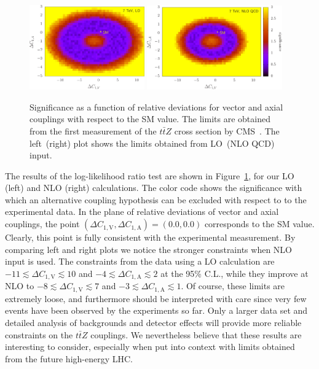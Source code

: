 \documentclass{JHEP3}
\def\ttbZ{t\bar{t}Z}
\def\DConeA{\Delta C_{1,\mathrm{A}}}
\def\DConeV{\Delta C_{1,\mathrm{V}}}
\begin{document}
\begin{figure}[t]
\centering 
\includegraphics[width=0.44\textwidth]{./CMS_LO.pdf}
\hspace{2mm}
\includegraphics[width=0.518\textwidth]{./CMS_NLO.pdf}
\caption{\label{fig:CMSbounds}
Significance as a function of relative deviations for vector and axial couplings with respect to the SM value. 
The limits are obtained from the first measurement of the $\ttbZ$ cross section by CMS~\cite{Chatrchyan:2013qca}. 
The left~(right) plot shows the limits obtained from LO~(NLO QCD) input.
}
\end{figure}
% 
The results of the log-likelihood ratio test are shown in Figure~\ref{fig:CMSbounds}, for our LO (left) and NLO (right) calculations.
The color code shows the significance with which an alternative coupling hypothesis can be excluded with respect to to the experimental data.
In the plane of relative deviations of vector and axial couplings, the point $(\DConeV,\DConeA)=(0.0,0.0)$ corresponds to the SM value.
Clearly, this point is fully consistent with the experimental measurement.
By comparing left and right plots we notice the stronger constraints when NLO input is used. 
The constraints from the data using a LO calculation are $ -11 \lesssim \DConeV \lesssim 10$ and $-4 \lesssim \DConeA \lesssim 2$ at the 95\% C.L.,
while they improve at NLO to $-8 \lesssim \DConeV \lesssim 7$ and $-3 \lesssim \DConeA \lesssim  1$.
Of course, these limits are extremely loose, and furthermore should be interpreted with care since very few events have been observed by the experiments so far.
Only a larger data set and detailed analysis of backgrounds and detector effects will provide more reliable constraints on the $\ttbZ$ couplings.
We nevertheless believe that these results are interesting to consider, especially when put into context with limits
obtained from the future high-energy LHC.
\end{document}
